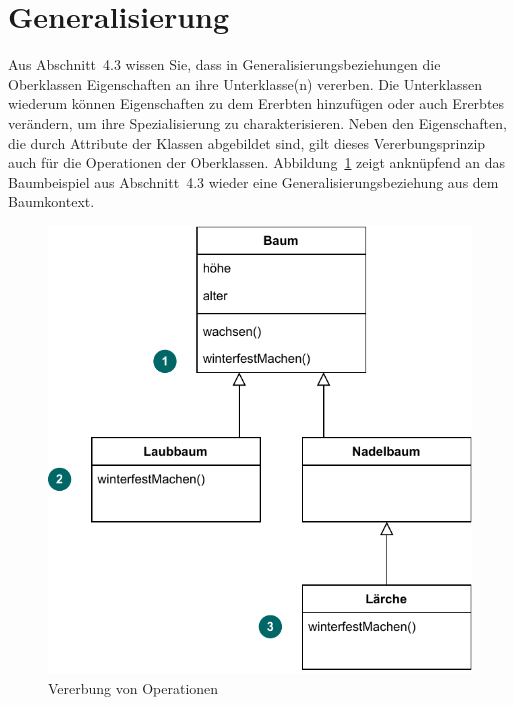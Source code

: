 \section{Generalisierung}
\label{sec:Kap-8.5}

Aus Abschnitt~4.3 wissen Sie, dass in Generalisierungsbeziehungen die Oberklassen Eigenschaften an ihre Unterklasse(n) vererben. Die Unterklassen wiederum können Eigenschaften zu dem Ererbten hinzufügen oder auch Ererbtes verändern, um ihre Spezialisierung zu charakterisieren. Neben den Eigenschaften, die durch Attribute der Klassen abgebildet sind, gilt dieses Vererbungsprinzip auch für die Opera\-tionen der Oberklassen. Abbildung~\ref{fig:generalisierung_baeume} zeigt anknüpfend an das Baumbeispiel aus Abschnitt~4.3 wieder eine Generalisierungsbeziehung aus dem Baumkontext.

\vspace{\baselineskip} %

\begin{figure}[h!]
	\centering
	\includegraphics[scale=1.0]{Bilder/Kapitel-8/generalisierung_baeume.pdf}
	\caption{Vererbung von Operationen}
	\label{fig:generalisierung_baeume}
\end{figure}

\vspace{\baselineskip} %

